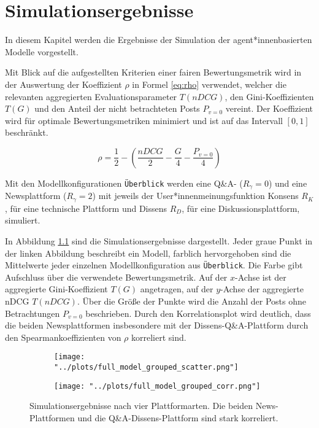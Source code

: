 \chapter{Simulationsergebnisse}

In diesem Kapitel werden die Ergebnisse der Simulation der agent*innenbasierten Modelle vorgestellt.

Mit Blick auf die aufgestellten Kriterien einer fairen Bewertungsmetrik wird in der Auswertung der Koeffizient $\rho$ in Formel \ref{eq:rho} verwendet, welcher die relevanten aggregierten Evaluationsparameter $T(nDCG)$, den Gini-Koeffizienten $T(G)$ und den Anteil der nicht betrachteten Posts $P_{v=0}$ vereint. Der Koeffizient wird für optimale Bewertungsmetriken minimiert und ist auf das Intervall $[0,1]$ beschränkt.

\begin{equation}
\label{eq:rho}
\rho =  \frac{1}{2} - (\frac{nDCG}{2} - \frac{G}{4} - \frac{P_{v=0}}{4})
\end{equation}

Mit den Modellkonfigurationen \texttt{Überblick} werden eine Q\&A- ($R_\gamma = 0$) und eine Newsplattform ($R_\gamma = 2$) mit jeweils der User*innenmeinungsfunktion Konsens $R_K$, für eine technische Plattform und Dissens $R_D$, für eine Diskussionsplattform, simuliert.

In Abbildung \ref{fig:cases} sind die Simulationsergebnisse dargestellt. Jeder graue Punkt in der linken Abbildung beschreibt ein Modell, farblich hervorgehoben sind die Mittelwerte jeder einzelnen Modellkonfiguration aus \texttt{Überblick}. Die Farbe gibt Aufschluss über die verwendete Bewertungsmetrik. Auf der $x$-Achse ist der aggregierte Gini-Koeffizient $T(G)$ angetragen, auf der $y$-Achse der aggregierte nDCG $T(nDCG)$. Über die Größe der Punkte wird die Anzahl der Posts ohne Betrachtungen $P_{v=0}$ beschrieben. Durch den Korrelationsplot wird deutlich, dass die beiden Newsplattformen insbesondere mit der Dissens-Q\&A-Plattform durch den Spearmankoeffizienten von $\rho$ korreliert sind.



\begin{figure}[!h]
	\begin{subfigure}{0.5\textwidth}
		\texttt{[image: "../plots/full\_model\_grouped\_scatter.png"]}
	\end{subfigure}
	\begin{subfigure}{0.5\textwidth}
		\texttt{[image: "../plots/full\_model\_grouped\_corr.png"]}
	\end{subfigure}
	\caption{Simulationsergebnisse nach vier Plattformarten. Die beiden News-Plattformen und die Q\&A-Dissens-Plattform sind stark korreliert.}
	\label{fig:cases}	
\end{figure}

